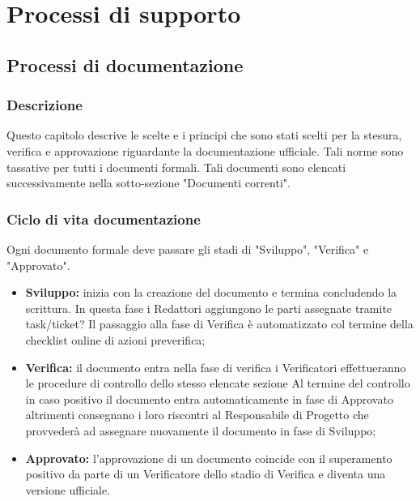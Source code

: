 \documentclass[NormeDiProgetto.tex]{subfiles}
\begin{document}
	
	\chapter{Processi di supporto}
	
	\section{Processi di documentazione}
	\subsection{Descrizione}
	Questo capitolo descrive le scelte e i principi che sono stati scelti per la
	stesura, verifica e approvazione riguardante la documentazione ufficiale.
	Tali norme sono tassative per tutti i documenti formali.
	Tali documenti sono elencati successivamente nella sotto-sezione "Documenti correnti".
	
	\subsection{Ciclo di vita documentazione}
	Ogni documento formale deve passare gli stadi di "Sviluppo", "Verifica" e "Approvato".
	\begin{itemize}
		\item \textbf{Sviluppo:} inizia con la creazione del documento e termina concludendo la scrittura. In questa fase i Redattori aggiungono le parti assegnate tramite task/ticket? %
		Il passaggio alla fase di Verifica è automatizzato col termine della checklist online di azioni pre\textunderscore verifica;
		
		\item \textbf{Verifica:} il documento entra nella fase di verifica i Verificatori effettueranno le procedure di controllo dello stesso elencate sezione %
		Al termine del controllo in caso positivo il documento entra automaticamente in fase di Approvato altrimenti consegnano i loro riscontri al Responsabile di Progetto che provvederà ad assegnare nuovamente il documento in fase di Sviluppo;
		
		\item \textbf{Approvato:} l'approvazione di un documento coincide con il superamento positivo da parte di un Verificatore dello stadio di Verifica e diventa una versione ufficiale.
	\end{itemize}
	
\end{document}
